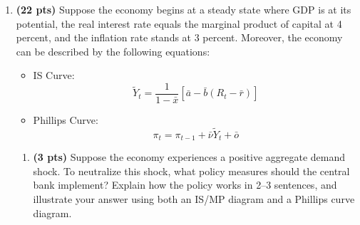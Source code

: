 \documentclass[14pt, oneside]{memoir}
\begin{document}
{{{\begin{enumerate}[label=\textbf{\arabic*.}, itemsep=15pt]
\begin{enumerate}[label=(\alph*)]
	Based on this, we can calculate if the consumer is saving or borrowing:
	\[c^* = 356.06 < y + f = 550 \]
	
	Therefore, the consumer is consume less than the earning plus initial wealth, which implies the consume is a saver.
	
	\item Increase the $\tau$ to 0.6. It won't change the $c^*$ but it would reduce how much the consumer are allowed to consume under the constraint, which amount to $310.90$.  Since $c^* = 356.06 > 310.9$, the consumer would choose only consume at the maximum amount at 310.9
	
	
	
	\item No, the consumer cannot perfectly smooth consumption under this social security arrangement. Unlike in a perfect financial market, borrowing constraints prevent the consumer from borrowing against future social security income, which means they cannot freely choose their optimal consumption bundle. Part d) and e) are an example of it. The consumer would have to choose the $c_{max}$ instead of the optimal consumption bundle calculated from the utility maximization problem.
	
	
\end{enumerate}




\newpage

\item  \textbf{(22 pts)}\label{P4} Suppose the economy begins at a steady state where GDP is at its potential, the real interest rate equals the marginal product of capital at 4 percent, and the inflation rate stands at 3 percent. Moreover, the economy can be described by the following equations:
\begin{itemize}
	\item IS Curve: 
	\[
	\tilde{Y}_t = \frac{1}{1-\bar{x}}\left[\bar{a} - \bar{b}(R_t-\bar{r})\right]
	\]
	\item Phillips Curve: 
	\[
	\pi_{t} = \pi_{t-1} + \bar{\nu}\tilde{Y}_t + \bar{o}
	\]
	
\end{itemize}

\begin{enumerate}[label=(\alph*)]
	\item \textbf{(3 pts)} Suppose the economy experiences a positive aggregate demand shock. To neutralize this shock, what policy measures should the central bank implement? Explain how the policy works in 2–3 sentences, and illustrate your answer using both an IS/MP diagram and a Phillips curve diagram.
	

\end{enumerate}
\end{enumerate}}}}
\end{document}

